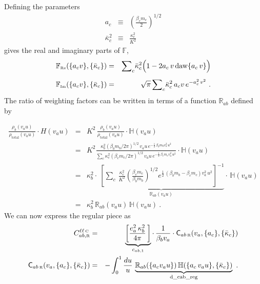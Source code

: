 \documentclass[preprint,12pt,eqsecnum,nofootinbib,amsmath,amssymb]{revtex4}
\newcommand{\smC}{{\rm\scriptscriptstyle C}}
\newcommand{\smR}{{\rm\scriptscriptstyle R}}
\newcommand{\smRe}{{\rm\scriptscriptstyle Re}}
\newcommand{\smIm}{{\rm\scriptscriptstyle Im}}
\begin{document}
{{%
Defining the parameters
\begin{eqnarray}
  a_c
  &\equiv&
  \left(\frac{\beta_c m_c}{2} \right)^{1/2}
\\[5pt]
  \bar\kappa_c^2 
  &\equiv &
  \frac{\kappa_c^2}{K^2} 
\end{eqnarray}
gives the real and imaginary parts of $\mathbb{F}$, 
\begin{eqnarray}
  \mathbb{F}_\smRe(\{a_c v\},\{\bar\kappa_c\}) &=& 
  {\sum}_c \bar\kappa_c^2 \Big(1 - 2 a_c\, v\,{\rm daw}\{a_c\, v\}\Big)
\label{defFreA}
\\[5pt]
  \mathbb{F}_\smIm(\{a_c v\},\{\bar\kappa_c\}) &=& 
  \sqrt{\pi}\,{\sum}_c \bar\kappa_c^2\,a_c v\, e^{-a_c^2\, v^2} \ .
\label{defFimA}
\end{eqnarray}
The ratio of weighting factors can be written in terms of a function
$\mathbb{R}_{ab}$ defined by

\begin{eqnarray}
  \frac{\rho_b(v_a u)}{\rho_\text{total}(v_a u)} \cdot H(v_a u)
  &=&
  K^2\,\frac{\rho_b(v_a u)}{\rho_\text{total}(v_a u)} \cdot
  \mathbb{H}(v_a u)
\\[5pt]
  &=&
  K^2 \frac{
  \kappa_b^2 \left(\beta_b m_b/2\pi\right)^{1/2} \,v_a u\,
  e^{-\frac{1}{2}\,\beta_b m_b v_a^2\, u^2}}
  {{\sum}_c\kappa_c^2 \left(\beta_c m_c/2\pi\right)^{1/2} 
  \, v_a u\,  e^{-\frac{1}{2}\,\beta_c m_c v_a^2\, u^2}}
  \cdot \mathbb{H}(v_a u)
\\[5pt]
  &=&
  \kappa_b^2 \cdot 
  \underbrace{~
  \left[{\sum}_c \, \frac{\kappa_c^2}{K^2} 
  \left(\frac{\beta_c m_c}{\beta_b m_b}\right)^{1/2} 
  e^{\frac{1}{2}\,(\beta_b m_b-\beta_c m_c) v_a^2\, u^2}
  \right]^{-1}}_{\mathbb{R}_{ab}(v_a u)} \cdot \,
  \mathbb{H}(v_a u) 
\\[5pt]
  &=&
  \kappa_b^2 \, \mathbb{R}_{ab}(v_a u) \, \mathbb{H}(v_a u) \ .
\end{eqnarray}
We can now express the regular piece as
\begin{eqnarray}
  C^{\ell\ell \, \smC}_{ab,\smR}
  &=& 
  \underbrace{
  \left[
  \frac{e_a^2\, \kappa_b^2}{4\pi}\,
  \right] 
  }_{c_{ab,1}}
  \cdot \,
  \frac{1}{\beta_b v_a}
  \cdot
  {\sf C}_{ab\,\smR}(v_a,\{a_c\},\{\bar\kappa_c\})
\\
  {\sf C}_{ab\,\smR}(v_a,\{a_c\},\{\bar\kappa_c\})
  &=&
  -\int_0^1 \frac{du}{ u}\,
  \underbrace{
  \mathbb{R}_{ab}(\{a_c v_a u\})\,
  \mathbb{H}(\{a_c\,v_a u\},\{\bar\kappa_c\})  
  }_{\rm d\_cab\_reg}
  \ .
\end{eqnarray}

}}
\end{document}
